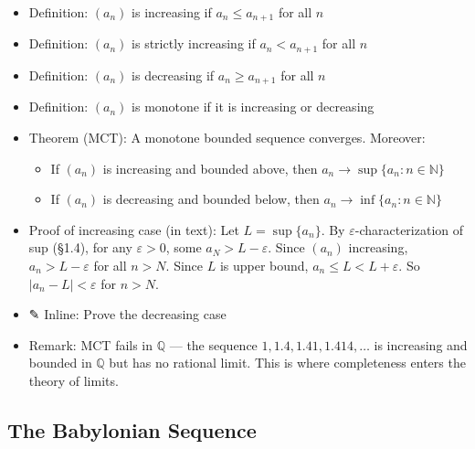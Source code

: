 \documentclass[
  10pt,
  letterpaper,
]{scrbook}
\providecommand{\tightlist}{%
  \setlength{\itemsep}{0pt}\setlength{\parskip}{0pt}}
\newcommand{\NN}{\mathbb{N}}
\newcommand{\QQ}{\mathbb{Q}}
\begin{document}
\begin{itemize}
\tightlist
\item
  Definition: \((a_n)\) is increasing if \(a_n \leq a_{n+1}\) for all
  \(n\)
\item
  Definition: \((a_n)\) is strictly increasing if \(a_n < a_{n+1}\) for
  all \(n\)
\item
  Definition: \((a_n)\) is decreasing if \(a_n \geq a_{n+1}\) for all
  \(n\)
\item
  Definition: \((a_n)\) is monotone if it is increasing or decreasing
\item
  Theorem (MCT): A monotone bounded sequence converges. Moreover:

  \begin{itemize}
  \tightlist
  \item
    If \((a_n)\) is increasing and bounded above, then
    \(a_n \to \sup\{a_n : n \in \NN\}\)
  \item
    If \((a_n)\) is decreasing and bounded below, then
    \(a_n \to \inf\{a_n : n \in \NN\}\)
  \end{itemize}
\item
  Proof of increasing case (in text): Let \(L = \sup\{a_n\}\). By
  \(\varepsilon\)-characterization of sup (§1.4), for any
  \(\varepsilon > 0\), some \(a_N > L - \varepsilon\). Since \((a_n)\)
  increasing, \(a_n > L - \varepsilon\) for all \(n > N\). Since \(L\)
  is upper bound, \(a_n \leq L < L + \varepsilon\). So
  \(|a_n - L| < \varepsilon\) for \(n > N\).
\item
  ✎ Inline: Prove the decreasing case
\item
  Remark: MCT fails in \(\QQ\) --- the sequence
  \(1, 1.4, 1.41, 1.414, \ldots\) is increasing and bounded in \(\QQ\)
  but has no rational limit. This is where completeness enters the
  theory of limits.
\end{itemize}

\subsection{The Babylonian Sequence}\label{the-babylonian-sequence}
\end{document}
